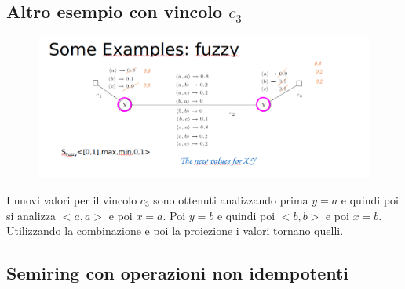 \subsection{Altro esempio con vincolo \texorpdfstring{$c_3$}{c3}}
\begin{figure}[htp]
    \centering
    \includegraphics[width=16cm, keepaspectratio]{img/Cap5/FUZZY2.png}
\end{figure}
I nuovi valori per il vincolo $c_3$ sono ottenuti analizzando prima $y = a$ e
quindi poi si analizza $<a, a>$ e poi $x = a$. Poi $y = b$ e quindi poi $<b, b>$ e
poi $x = b$. Utilizzando la combinazione e poi la proiezione i valori tornano
quelli.
\subsection{Semiring con operazioni non idempotenti}
